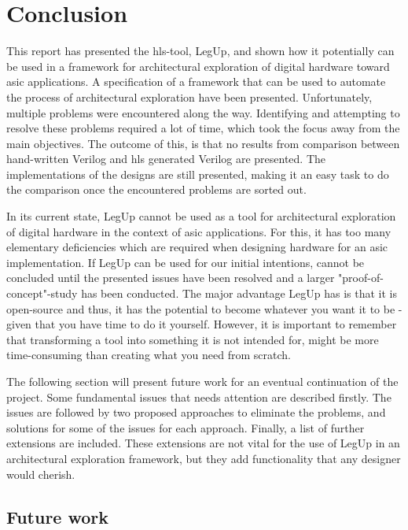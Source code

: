 \chapter{Conclusion}
\label{chp:conclusion} 
This report has presented the \gls{hls}-tool, LegUp, and shown how it potentially can be used in a framework for architectural exploration of digital hardware toward \gls{asic} applications. A specification of a framework that can be used to automate the process of architectural exploration have been presented. Unfortunately, multiple problems were encountered along the way. Identifying and attempting to resolve these problems required a lot of time, which took the focus away from the main objectives. The outcome of this, is that no results from comparison between hand-written Verilog and \gls{hls} generated Verilog are presented. The implementations of the designs are still presented, making it an easy task to do the comparison once the encountered problems are sorted out.

In its current state, LegUp cannot be used as a tool for architectural exploration of digital hardware in the context of \gls{asic} applications. For this, it has too many elementary deficiencies which are required when designing hardware for an \gls{asic} implementation. If LegUp can be used for our initial intentions, cannot be concluded until the presented issues have been resolved and a larger "proof-of-concept"-study has been conducted. The major advantage LegUp has is that it is open-source and thus, it has the potential to become whatever you want it to be - given that you have time to do it yourself. However, it is important to remember that transforming a tool into something it is not intended for, might be more time-consuming than creating what you need from scratch.

The following section will present future work for an eventual continuation of the project. Some fundamental issues that needs attention are described firstly. The issues are followed by two proposed approaches to eliminate the problems, and solutions for some of the issues for each approach. Finally, a list of further extensions are included. These extensions are not vital for the use of LegUp in an architectural exploration framework, but they add functionality that any designer would cherish.
\section{Future work}
\label{sec:futurework} 


